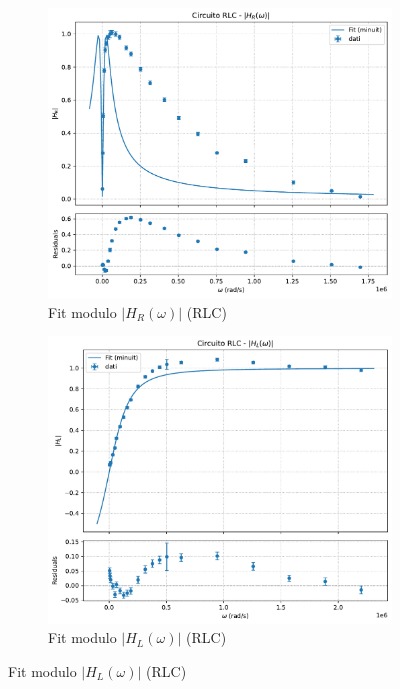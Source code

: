 \documentclass[a4paper]{article}
\begin{document}
\begin{figure}[htbp]
    \centering

    \begin{subfigure}[b]{0.495\textwidth}
        \centering
        \includegraphics[width=\linewidth]{grafici/rlc_hr.pdf}
        \caption{Fit modulo $|H_R(\omega)|$ (RLC)}
        \label{fig:rlc_hr}
    \end{subfigure}
    \hfill
    \begin{subfigure}[b]{0.495\textwidth}
        \centering
        \includegraphics[width=\linewidth]{grafici/rlc_hl.pdf}
        \caption{Fit modulo $|H_L(\omega)|$ (RLC)}
        \label{fig:rlc_hl}
    \end{subfigure}


\end{figure}
\end{document}
